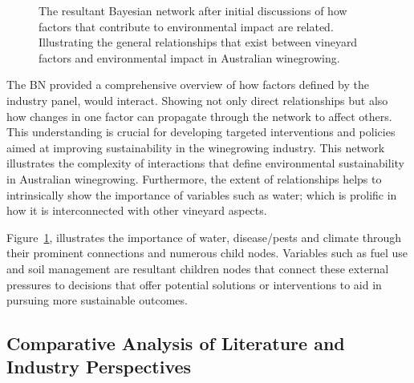 
% 
\begin{figure}[h!]
    \centering
    \caption{The resultant Bayesian network after initial discussions of how factors that contribute to environmental impact are related. Illustrating the general relationships that exist between vineyard factors and environmental impact in Australian winegrowing.}\label{fig:generalBN}
\end{figure}

The BN provided a comprehensive overview of how factors defined by the industry panel, would interact. Showing not only direct relationships but also how changes in one factor can propagate through the network to affect others. This understanding is crucial for developing targeted interventions and policies aimed at improving sustainability in the winegrowing industry. This network illustrates the complexity of interactions that define environmental sustainability in Australian winegrowing. Furthermore, the extent of relationships helps to intrinsically show the importance of variables such as water; which is prolific in how it is interconnected with other vineyard aspects.

Figure~\ref{fig:generalBN}, illustrates the importance of water, disease/pests and climate through their prominent connections and numerous child nodes. Variables such as fuel use and soil management are resultant children nodes that connect these external pressures to decisions that offer potential solutions or interventions to aid in pursuing more sustainable outcomes.

\subsection{Comparative Analysis of Literature and Industry Perspectives}

